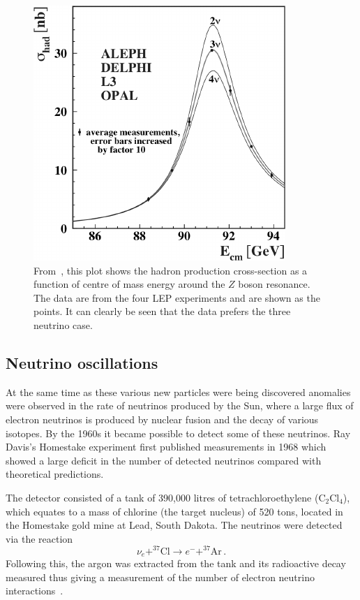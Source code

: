 \begin{figure}[h]
  \centering
  \includegraphics[width=.5\linewidth]{files/figures/theory/zBosonWidth}
  \caption{From~\cite{zBosonWidth}, this plot shows the hadron production cross-section as a function of centre of mass energy around the $Z$ boson resonance. The data are from the four LEP experiments and are shown as the points. It can clearly be seen that the data prefers the three neutrino case.}
  \label{fig:zBosonWidth}
\end{figure}

\subsection{Neutrino oscillations}
\label{sec:theory:history:oscillations}

At the same time as these various new particles were being discovered anomalies were observed in the rate of neutrinos produced by the Sun, where a large flux of electron neutrinos is produced by nuclear fusion and the decay of various isotopes. 
By the 1960s it became possible to detect some of these neutrinos.
Ray Davis's Homestake experiment first published measurements in 1968 which showed a large deficit in the number of detected neutrinos compared with theoretical predictions.

The detector consisted of a tank of 390,000 litres of tetrachloroethylene ($\text{C}_{2}\text{Cl}_{4}$), which equates to a mass of chlorine (the target nucleus) of 520 tons, located in the Homestake gold mine at Lead, South Dakota.
The neutrinos were detected via the reaction
\begin{equation}
  \nu_{e} + ^{37}\text{Cl} \rightarrow e^{-} + ^{37}\text{Ar} \, .
\end{equation}
Following this, the argon was extracted from the tank and its radioactive decay measured thus giving a measurement of the number of electron neutrino interactions~\cite{rayDavis}.

